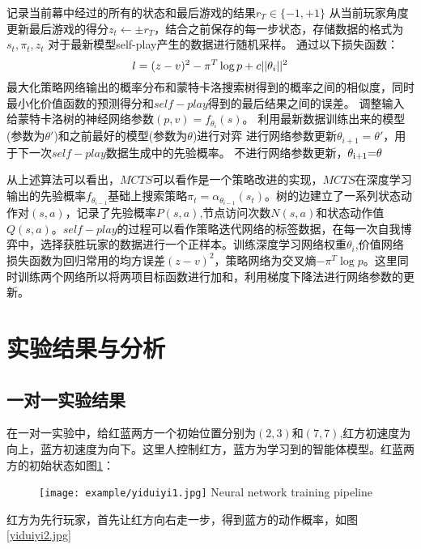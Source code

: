 		\begin{algorithm}[!htbp]
		\begin{algorithmic}[1]
		\State 记录当前幕中经过的所有的状态和最后游戏的结果${r_T} \in \{  - 1, + 1\} $
		\State 从当前玩家角度更新最后游戏的得分${z_t} \leftarrow  \pm {r_T}$，结合之前保存的每一步状态，存储数据的格式为$s_t,\pi_t,z_t$
		\EndFor
		\State 对于最新模型self-play产生的数据进行随机采样。
		\State 通过以下损失函数：
		\begin{equation}
		l = {(z - v)^2} - {\pi ^T}\log p + c||{\theta _i}{\rm{|}}{{\rm{|}}^{\rm{2}}}
		\end{equation}
		最大化策略网络输出的概率分布和蒙特卡洛搜索树得到的概率之间的相似度，同时最小化价值函数的预测得分和$self-play$得到的最后结果之间的误差。
		调整输入给蒙特卡洛树的神经网络参数$(p,v) = {f_{{\theta _i}}}(s)$。
		\State 利用最新数据训练出来的模型(参数为$\theta '$)和之前最好的模型(参数为$\theta$)进行对弈
		 \State 进行网络参数更新${\theta _{i + 1}} = \theta '$，用于下一次$self-play$数据生成中的先验概率。
		\Else
		 \State 不进行网络参数更新，${\theta _{{\rm{i + 1}}}}{\rm{ = }}\theta $
		\EndIf
		\EndIf
		\EndFor
	\end{algorithmic}
\end{algorithm}

从上述算法可以看出，$MCTS$可以看作是一个策略改进的实现，$MCTS$在深度学习输出的先验概率${f_{{\theta _{i - 1}}}}$基础上搜索策略${\pi _t} = {\alpha _{{\theta _{i - 1}}}}({s_t})$。树的边建立了一系列状态动作对$(s,a)$，记录了先验概率$P(s,a)$,节点访问次数$N(s,a)$和状态动作值$Q(s,a)$。$self-play$的过程可以看作策略迭代网络的标签数据，在每一次自我博弈中，选择获胜玩家的数据进行一个正样本。训练深度学习网络权重${\theta _i}$,价值网络损失函数为回归常用的均方误差${(z - v)^2}$，策略网络为交叉熵$ - {\pi ^T}\log p$。这里同时训练两个网络所以将两项目标函数进行加和，利用梯度下降法进行网络参数的更新。

\section{实验结果与分析}

\subsection{一对一实验结果}
在一对一实验中，给红蓝两方一个初始位置分别为$(2,3)$和$(7,7)$,红方初速度为向上，蓝方初速度为向下。这里人控制红方，蓝方为学习到的智能体模型。红蓝两方的初始状态如图\ref{yiduiyi1.jpg}：
\begin{figure}[!hbtp]
	\centering
	\texttt{[image: example/yiduiyi1.jpg]}
	{Neural network training pipeline}
	\label{yiduiyi1.jpg}
\end{figure}
红方为先行玩家，首先让红方向右走一步，得到蓝方的动作概率，如图\ref{yiduiyi2.jpg}


